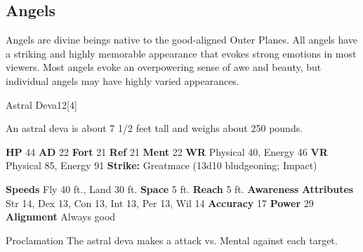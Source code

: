 {{      
    \subsection{Angels}
      
      Angels are divine beings native to the good-aligned Outer Planes.
      All angels have a striking and highly memorable appearance that evokes strong emotions in most viewers.
      Most angels evoke an overpowering sense of awe and beauty, but individual angels may have highly varied appearances.
    

      

      
  \begin{monsubsection}{Astral Deva}{12}[4]
    \vspace{-1em}\vspace{-1em}
    \vspace{0em}

    
         An astral deva is about 7 1/2 feet tall and weighs about 250 pounds.
        
    

    \begin{spellcontent}
      \begin{spelltargetinginfo}
        \pari \textbf{HP} 44 \monsep
          \textbf{AD} 22 \monsep
          \textbf{Fort} 21 \monsep
          \textbf{Ref} 21 \monsep
          \textbf{Ment} 22
        \pari \textbf{WR} Physical 40, Energy 46 \monsep
        \textbf{VR} Physical 85, Energy 91
        \pari \textbf{Strike:}
            Greatmace  (13d10 bludgeoning; Impact)
      \end{spelltargetinginfo}
    \end{spellcontent}
    \begin{monsterfooter}
      \pari \textbf{Speeds} Fly 40 ft., Land 30 ft. \monsep
        \textbf{Space} 5 ft. \monsep
        \textbf{Reach} 5 ft.
      \pari \textbf{Awareness} 
      \pari \textbf{Attributes}
        Str 14, Dex 13,
        Con 13, Int 13,
        Per 13, Wil 14
      \pari \textbf{Accuracy} 17 \monsep
        \textbf{Power} 29
      \pari \textbf{Alignment} Always good
    \end{monsterfooter}
  \end{monsubsection}
  \begin{freeability}{Proclamation}
       The astral deva makes a  attack
        vs. Mental against each target.
    

\end{freeability}}}

